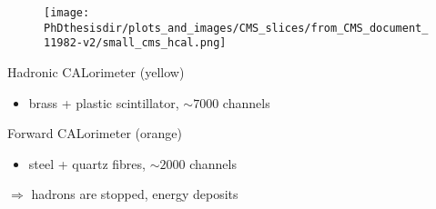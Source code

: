 \begin{frame}
\addtocounter{framenumber}{-1}
\begin{minipage}[t]{.6\textwidth}
\begin{figure}
\texttt{[image: \\PhDthesisdir/plots\_and\_images/CMS\_slices/from\_CMS\_document\_11982-v2/small\_cms\_hcal.png]}
\end{figure}
\end{minipage}
\hfill\begin{minipage}[t]{.35\textwidth}
\begin{block}{Hadronic CALorimeter (yellow)}
\begin{itemize}
\item brass + plastic scintillator, $\sim\num{7000}$ channels
\end{itemize}
\end{block}

\begin{block}{Forward CALorimeter (orange)}
\begin{itemize}
\item steel + quartz fibres, $\sim\num{2000}$ channels
\end{itemize}
\end{block}

\begin{block}{}
$\Rightarrow$ hadrons are stopped, energy deposits
\end{block}
\end{minipage}
\end{frame}

